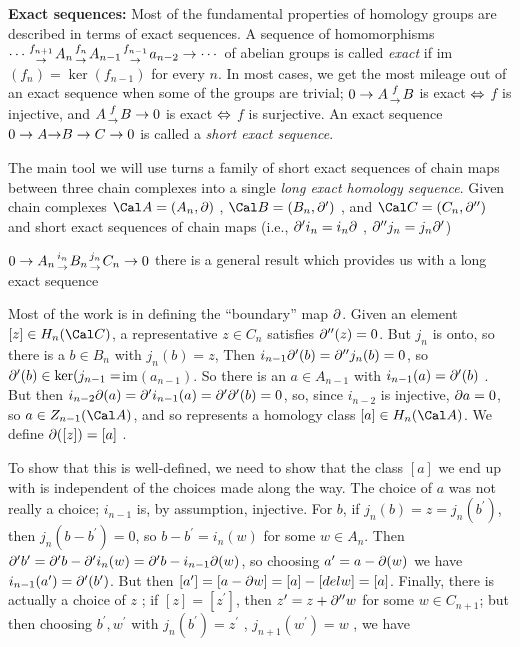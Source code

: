 \msk

{\bf Exact sequences:} Most of the fundamental properties of homology groups
are described in terms of exact sequences. A sequence of homomorphisms
\hhsk $\cdots {f_{n+1}\atop\rightarrow} A_n {f_n\atop\rightarrow} A_{n-1} {f_{n-1}\atop\rightarrow} a_{n-2} 
\rightarrow \cdots$ \hhsk
of abelian groups is called {\it exact} if im$(f_n)=\ker(f_{n-1})$ 
for every $n$. In most cases,
we get the most mileage out of an exact sequence when some of the groups
are trivial; $0\rightarrow A {f\atop\rightarrow}B$ is exact $\Leftrightarrow$ $f$ is injective, and 
$A {f\atop\rightarrow}B\rightarrow 0$ is exact $\Leftrightarrow$ $f$ is surjective. 
An exact sequence $0\rightarrow A {\rightarrow}B\rightarrow C\rightarrow 0$ is called a {\it short exact sequence}.

\msk

The main tool we will use turns a family of short exact sequences of chain maps
between three chain complexes into a single {\it long exact homology sequence}.
Given chain complexes ${\Cal A}=(A_n,\del)$ , 
${\Cal B}=(B_n,\del^\prime)$ , and ${\Cal C}=(C_n,\del^{\prime\prime})$
and short exact sequences of chain maps (i.e., 
$\partial^\prime i_n  = i_n\partial $ , $\partial^{\prime\prime}j_n = j_n\partial^\prime $)
\hhsk

$0\rightarrow A_n{i_n\atop \rightarrow}B_n{j_n\atop \rightarrow}C_n\rightarrow 0$
\hhsk
there is a general result which provides us with a long exact sequence


Most of the work is in defining the ``boundary'' map $\partial$. Given an 
element $[z]\in H_n({\Cal C})$, a representative $z\in C_n$ satisfies 
$\partial^{\prime\prime}(z)=0$. But $j_n$ is onto, so there is a $b\in B_n$ with
$j_n(b)=z$, Then $ i_{n-1}\partial^\prime(b) = \partial^{\prime\prime}j_n(b)
=0$, so $\partial^\prime(b)\in\ker(j_{n-1}=$im$(a_{n-1})$. So there is an $a\in A_{n-1}$
with $i_{n-1}(a)=\partial^\prime(b)$ . But then 
$i_{n-2}\partial (a) = \partial^\prime i_{n-1}(a)=\partial^\prime\partial^\prime(b)=0$,
so, since $i_{n-2}$ is injective, $\partial a=0$, so $a\in Z_{n-1}({\Cal A})$, and
so represents a homology class $[a]\in H_n({\Cal A})$. We define
$\partial([z])=[a]$ . 


To show that this is well-defined, we need to show that the
class $[a]$ we end up with is independent of the choices made along the 
way. The choice of $a$ was not really a choice; $i_{n-1}$ is, by assumption, 
injective. For $b$, if $j_n(b)=z=j_n(b^\prime)$, then
$j_n(b-b^\prime)=0$, so $b-b^\prime=i_n(w)$ for some $w\in A_n$. Then 
$\partial^\prime b^\prime = \partial^\prime b - \partial^\prime i_n(w) = 
\partial^\prime b - i_{n-1} \partial(w)$, so choosing $a^\prime = a-\partial(w)$ we have
$i_{n-1}(a^\prime)=\partial^\prime(b^\prime)$. But then
$[a^\prime]=[a-\partial w] =[a] -[del w] =[a]$. Finally, there is actually a choice
of $z$ ; if $[z]=[z^\prime]$, then $z^\prime = z+\partial^{\prime\prime}w$
for some $w\in C_{n+1}$; but then choosing $b^\prime,w^\prime$ with 
$j_n(b^\prime)=z^\prime$ , $j_{n+1}(w^\prime)=w$ , we have 

